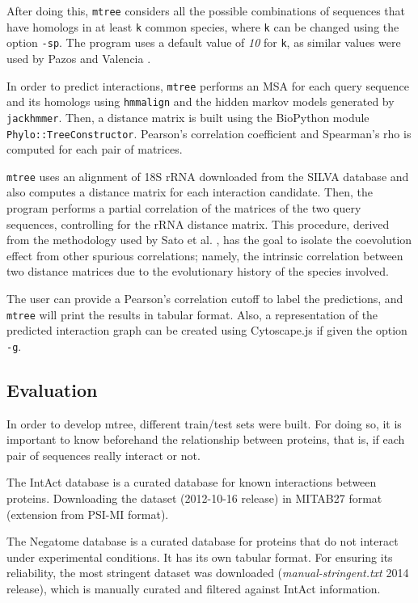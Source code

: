 \documentclass[11pt]{article}
\begin{document}
After doing this, \texttt{mtree} considers all the possible combinations of sequences that have homologs in at least \texttt{k} common species, where \texttt{k} can be changed using the option \texttt{-sp}. The program uses a default value of \emph{10} for \texttt{k}, as similar values were used by Pazos and Valencia \cite{Pazos2001}.


In order to predict interactions, \texttt{mtree} performs an MSA for each query sequence and its homologs using \texttt{hmmalign} and the hidden markov models generated by \texttt{jackhmmer}. Then, a distance matrix is built using the BioPython module \texttt{Phylo::TreeConstructor}. Pearson's correlation coefficient and Spearman's rho is computed for each pair of matrices. 

\texttt{mtree} uses an alignment of 18S rRNA downloaded from the SILVA database \cite{SILVA} and also computes a distance matrix for each interaction candidate. Then, the program performs a partial correlation of the matrices of the two query sequences, controlling for the rRNA distance matrix. This procedure, derived from the methodology used by Sato et al. \cite{Sato2005}, has the goal to isolate the coevolution effect from other spurious correlations; namely, the intrinsic correlation between two distance matrices due to the evolutionary history of the species involved.

The user can provide a Pearson's correlation cutoff to label the predictions, and \texttt{mtree} will print the results in tabular format. Also, a representation of the predicted interaction graph can be created using Cytoscape.js \cite{Franz15012016}  if given the option \texttt{-g}.



\subsection{Evaluation}

In order to develop mtree, different train/test sets were built. For doing so, it is important to know beforehand the relationship between proteins, that is, if each pair of sequences really interact or not.

The IntAct database\cite{intact} is a curated database for known interactions between proteins. Downloading the dataset (2012-10-16 release) in MITAB27 format (extension from PSI-MI format).

The Negatome database\cite{negatome} is a curated database for proteins that do not interact under experimental conditions. It has its own tabular format. For ensuring its reliability, the most stringent dataset was downloaded (\textit{manual-stringent.txt} 2014 release), which is manually curated and filtered against IntAct information.
\end{document}
